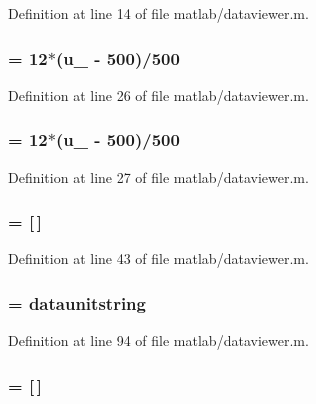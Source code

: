Definition at line 14 of file matlab/dataviewer.m.
\subsubsection[{u\_\-2}]{ = 12$\ast$({\bf u\_} -\/ 500)/500}\label{matlab_2dataviewer_8m_a3d5b0d701fb4fdc2c6b27abaf5c6b5c8}


Definition at line 26 of file matlab/dataviewer.m.
\subsubsection[{u\_\-3}]{ = 12$\ast$({\bf u\_} -\/ 500)/500}\label{matlab_2dataviewer_8m_a9ab9ff12ff95c55341941011872c456a}


Definition at line 27 of file matlab/dataviewer.m.
\subsubsection[{u\_\-af}]{ = [$\,$]}\label{matlab_2dataviewer_8m_a9da968bed76e2c655562c3b412ba41a7}


Definition at line 43 of file matlab/dataviewer.m.
\subsubsection[{u\_\-af\_\-unitstring}]{ = {\bf dataunitstring}}\label{matlab_2dataviewer_8m_a2d0965ed9d0d32a10d2daa9309c3a3f3}


Definition at line 94 of file matlab/dataviewer.m.
\subsubsection[{u\_\-as}]{ = [$\,$]}\label{matlab_2dataviewer_8m_a51ee6d3a6e8a57a900f9e12d81e17cbd}


